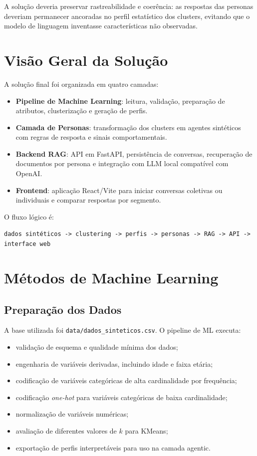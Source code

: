 \documentclass[12pt,a4paper]{article}
\begin{document}
A solução deveria preservar rastreabilidade e coerência: as respostas das personas deveriam permanecer ancoradas no perfil estatístico dos clusters, evitando que o modelo de linguagem inventasse características não observadas.

\section{Visão Geral da Solução}

A solução final foi organizada em quatro camadas:

\begin{itemize}
  \item \textbf{Pipeline de Machine Learning}: leitura, validação, preparação de atributos, clusterização e geração de perfis.
  \item \textbf{Camada de Personas}: transformação dos clusters em agentes sintéticos com regras de resposta e sinais comportamentais.
  \item \textbf{Backend RAG}: API em FastAPI, persistência de conversas, recuperação de documentos por persona e integração com LLM local compatível com OpenAI.
  \item \textbf{Frontend}: aplicação React/Vite para iniciar conversas coletivas ou individuais e comparar respostas por segmento.
\end{itemize}

O fluxo lógico é:

\begin{center}
\texttt{dados sintéticos -> clustering -> perfis -> personas -> RAG -> API -> interface web}
\end{center}

\section{Métodos de Machine Learning}

\subsection{Preparação dos Dados}

A base utilizada foi \texttt{data/dados\_sinteticos.csv}. O pipeline de ML executa:

\begin{itemize}
  \item validação de esquema e qualidade mínima dos dados;
  \item engenharia de variáveis derivadas, incluindo idade e faixa etária;
  \item codificação de variáveis categóricas de alta cardinalidade por frequência;
  \item codificação \textit{one-hot} para variáveis categóricas de baixa cardinalidade;
  \item normalização de variáveis numéricas;
  \item avaliação de diferentes valores de $k$ para KMeans;
  \item exportação de perfis interpretáveis para uso na camada agentic.
\end{itemize}
\end{document}
